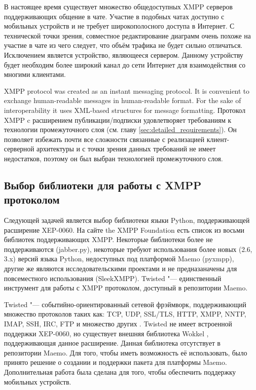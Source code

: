 В настоящее время существует множество общедоступных XMPP серверов
поддерживающих общение в чате. Участие в подобных чатах доступно с мобильных
устройств и не требует широкополосного доступа в Интернет. С технической точки
зрения, совместное редактирование диаграмм очень похоже на участие в чате из
чего следует, что объём трафика не будет сильно отличаться. Исключением является
устройство, являющееся сервером. Данному устройству будет необходим более
широкий канал до сети Интернет для взаимодействия со многими клиентами.

XMPP protocol was created as an instant messaging protocol. It is convenient to
exchange human-readable messages in human-readable format. For the sake of
interoperability it uses XML-based structures for message formatting. Протокол
XMPP c расширением публикации/подписки удовлетворяет требованиям к технологии
промежуточного слоя (см. главу \ref{sec:detailed_requirements}). Он позволяет
избежать почти все сложности связанные с реализацией клиент-серверной
архитектуры и с точки зрения данных требований не имеет недостатков, поэтому он
был выбран технологией промежуточного слоя.

\subsection{Выбор библиотеки для работы с XMPP протоколом}
Следующей задачей является выбор библиотеки языки Python, поддерживающей
расширение XEP-0060. На сайте the XMPP Foundation \cite{xmpp} есть список из
восьми библиотек поддерживающих XMPP. Некоторые библиотеки более не
поддерживаются (jabber.py), некоторые требуют использования более новых (2.6,
3.x) версий языка Python, недоступных под платформой Maemo (pyxmpp), другие же
являются исследовательскими проектами и не предназаначены для повсеместного
использования (SleekXMPP). Twisted "--- единственный инструмент для работы с
XMPP протоколом, доступный в репозитории Maemo.

Twisted "--- событийно-ориентированный сетевой фрэймворк, поддерживающий
множество протоколов таких как: TCP, UDP, SSL/TLS, HTTP, XMPP, NNTP, IMAP, SSH,
IRC, FTP и множество других \cite{twisted}. Twisted не имеет встроенной
поддержки XEP-0060, но существует внешняя библиотека Wokkel \cite{wokkel},
поддерживающая данное расширение. Данная библиотека отсутствует в репозитории
Maemo. Для того, чтобы иметь возможность её использовать, было принято решение о
создании и поддержки пакета для платформы Maemo. Дополнительная работа была
сделана для того, чтобы обеспечить поддержку мобильных устройств.


